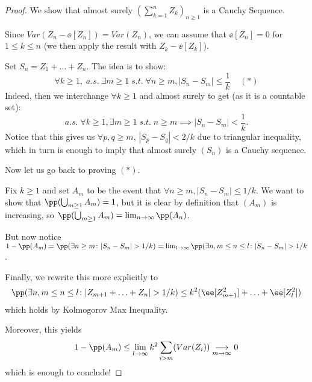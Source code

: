\documentclass[../main.tex]{subfiles}
\begin{document}
  \begin{proof}
    We show that almost surely $(\sum_{k=1}^n Z_k)_{n \geq 1}$ is a Cauchy
    Sequence.
    \vspace{0.4em}

    Since $Var(Z_n - \ee[Z_n]) = Var(Z_n)$, we can assume that $\ee[Z_n] = 0$
    for $1 \leq k \leq n$ (we then apply the result with $Z_k - \ee[Z_k]$).

    Set $S_n = Z_1 + \ldots + Z_n$. The idea is to show:
    \[
    \forall k \geq 1, \; a.s. \; \exists m \geq 1 \; s.t. \; \forall n \geq m, |S_n -
    S_m| \leq \frac{1}{k}  \;\;\;\;(\ast) 
    \] 
    Indeed, then we interchange $\forall k \geq 1$ and almost surely to get
    (as it is a countable set):
    \[
    a.s. \; \forall k \geq 1, \exists m \geq 1 \; s.t. \; n \geq m \implies
    |S_n - S_m| < \frac{1}{k} 
    .\] 
    Notice that this gives us $\forall p, q \geq m$, $|S_p - S_q| < 2/k$ due
    to triangular inequality, which in turn is enough to imply that almost
    surely $(S_n)$ is a Cauchy sequence.

    \vspace{1em}

    Now let us go back to proving $(\ast)$. 

    \vspace{0.2em}

    Fix $k \geq 1$ and set $A_m$ to be the event that 
      $\forall n \geq m, |S_n - S_m| \leq 1/k $. We want to show that
    $\pp(\bigcup_{m \geq 1} A_m) = 1$, but it is clear by definition that
    $(A_m)$ is increasing, so $\pp(\bigcup_{m \geq 1} A_m) = \lim_{n \to
    \infty}\pp(A_n)$.

    \vspace{0.2em}

    But now notice $1 - \pp(A_m) = \pp(\exists n \geq m \colon |S_n - S_m| >
    1/k) = \lim_{l \to \infty} \pp(\exists n, m \leq n \leq l \colon |S_n -
    S_m| > 1/k$. 

    \vspace{0.2em}

    Finally, we rewrite this more explicitly to 
    \begin{align*}
      \pp(\exists n, m \leq n \leq l \colon |Z_{m +1} + \ldots + Z_n| > 1/k)
      \leq k^2 (\ee[Z_{m+1}^2] + \ldots + \ee[Z_{l}^2])
    \end{align*} 
    which holds by Kolmogorov Max Inequality.
    \vspace{0.2em}

    Moreover, this yields
    \[
      1 - \pp(A_m) \leq \lim_{l \to \infty} k^2 \sum_{i > m} (Var(Z_i))
      \underset{m \to \infty}{\longrightarrow} 0
    \] 
    which is enough to conclude!
   \end{proof}
\end{document}
